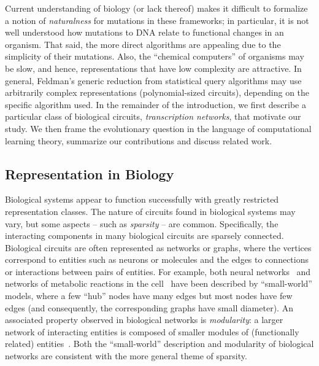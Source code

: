 \documentclass[11pt]{article}
\begin{document}
Current understanding of biology (or lack thereof) makes it
difficult to formalize a notion of \emph{naturalness} for mutations in these
frameworks; in particular, it is not well understood how mutations to DNA
relate to functional changes in an organism. That said, the more direct
algorithms are appealing due to the simplicity of their mutations.  Also, the
``chemical computers'' of organisms may be slow, and hence, representations that
have low complexity are attractive.  In general, Feldman's
generic reduction from statistical query algorithms may use arbitrarily complex
representations (polynomial-sized circuits), depending on the specific algorithm
used.  In the remainder of the introduction, we first describe a particular
class of biological circuits, \emph{transcription networks}, that motivate our
study.  We then frame the evolutionary question in the language of computational
learning theory, summarize our contributions and discuss related work.

\subsection{Representation in Biology}

Biological systems appear to function successfully with greatly restricted
representation classes. The nature of circuits found in biological systems may
vary, but some aspects -- such as \emph{sparsity} -- are common.  Specifically,
the interacting components in many biological circuits are sparsely connected.
Biological circuits are often represented as networks or graphs, where the
vertices correspond to entities such as neurons or molecules and the edges to
connections or interactions between pairs of entities. For example, both neural
networks~\cite{Watts:1998} and networks of metabolic reactions in the
cell~\cite{Wagner:2001,Barabasi:2000} have been described by ``small-world''
models, where a few ``hub'' nodes have many edges but most nodes have few edges
(and consequently, the corresponding graphs have small diameter).  An associated
property observed in biological networks is \emph{modularity}: a larger network
of interacting entities is composed of smaller modules of (functionally related)
entities~\cite{Hartwell:1999}.  Both the ``small-world'' description and
modularity of biological networks are consistent with the more general theme of
sparsity.
\end{document}
